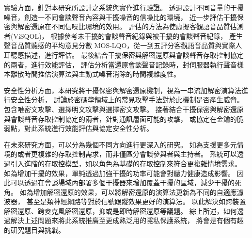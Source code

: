     實驗方面，針對本研究所設計之系統與實作進行驗證。
透過設計不同音量的干擾噪音，創造一不同會談聲音內容與干擾噪音的信噪比的環境，
近一步評估干擾保密與解密還原在不同信噪比環境的效用。
評估的方法為使虛擬客觀語音品質估測者(ViSQOL)，
根據參考未干擾的會談聲音紀錄與被干擾的會談聲音紀錄，
產生聲音品質聽感的平均意見分數 MOS-LQO，從一到五評分客觀語音品質與實際人耳聽感描述，進行評估。
最後結合干擾保密與解密還原與會談聲音存取控制協定的兩者，進行效能評估，
評估分析當還原會談聲音記錄時，封伺服器執行聲音樣本離散時間推估演算法與主動式噪音消除的時間複雜度性。

    安全性分析方面，本研究將干擾保密與解密還原機制，視為一串流加解密演算法進行安全性分析，
討論於密碼學領域上的常見攻擊手法對於此機制是否產生威脅。
包含唯密文攻擊、選擇明文攻擊與選擇密文攻擊。
接著結合干擾保密與解密還原與會談聲音存取控制協定的兩者，針對通訊層面可能的攻擊，
或協定在金鑰的脆弱點，對此系統進行效能評估與協定安全性分析。

    在未來研究方面，可以分為幾個不同方向進行更深入的研究。
如為支援更多元情境的或者更複雜的存取控制需求，而非僅區分會談參與者與主持者。
系統可以透過引入進階的存取控模型，如以角色為基礎的存取控制來符合更複雜情境需求。
如為增加干擾的效果，單純透過加強干擾的功率可能會對聽力健康造成影響。
因此可以透過在會談場域內部署多個干擾器來增加覆蓋干擾的區域，減少干擾的死角。
如為增加解密還原的效果，可以將解密還原的演算法更新為不同的自適應濾波器，
甚至是類神經網路等對於信號跟蹤效果更好的演算法。
以此解決如跨裝置解密還原、跨麥克風解密還原，抑或是即時解密還原等議題。
綜上所述，如何透過解決上述問題來將此系統推廣至更成熟泛用的隱私保護系統，
將會是有個有趣的研究題目與挑戰。